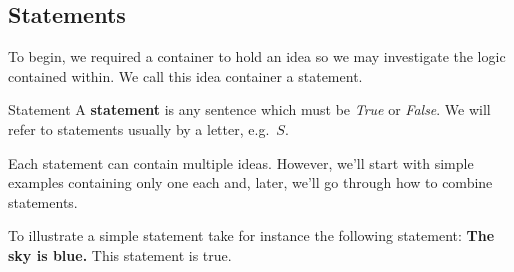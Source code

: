 \subsection{Statements}

To begin, we required a container to hold an idea so we may investigate the logic contained within.
We call this idea container a statement.

\begin{defn}{Statement}
  A \textbf{statement} is any sentence which must be \emph{True} or \emph{False}.
  We will refer to statements usually by a letter, e.g.\ $S$.
\end{defn}

Each statement can contain multiple ideas.
However, we'll start with simple examples containing only one each and, later, we'll go through how to combine statements.

\begin{ex}
  To illustrate a simple statement take for instance the following statement:
  \textbf{The sky is blue.}
  This statement is true.
\end{ex}
